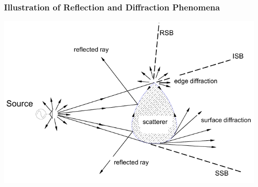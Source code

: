 \subsubsection{Illustration of Reflection and Diffraction Phenomena}
    \includegraphics[width=.3\paperheight]{content/aawp/pictures/scatterer.png}
